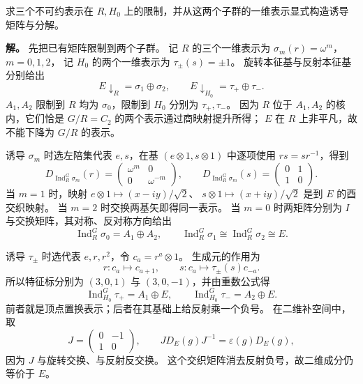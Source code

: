\begin{workedexample}[限制、商群提升与两个子群的诱导矩阵]
\label{ex:d3-comprehensive-induction}
求三个不可约表示在 $R,H_0$ 上的限制，并从这两个子群的一维表示显式构造诱导矩阵与分解。

\textbf{解。} 先把已有矩阵限制到两个子群。
记 $R$ 的三个一维表示为 $\sigma_m(r)=\omega^m$，$m=0,1,2$，
记 $H_0$ 的两个一维表示为 $\tau_\pm(s)=\pm1$。
旋转本征基与反射本征基分别给出
\[
E\downarrow_R=\sigma_1\oplus\sigma_2,\qquad
E\downarrow_{H_0}=\tau_+\oplus\tau_-.
\]
$A_1,A_2$ 限制到 $R$ 均为 $\sigma_0$，限制到 $H_0$ 分别为 $\tau_+,\tau_-$。
因为 $R$ 位于 $A_1,A_2$ 的核内，它们恰是 $G/R=C_2$ 的两个表示通过商映射提升所得；
$E$ 在 $R$ 上非平凡，故不能下降为 $G/R$ 的表示。

诱导 $\sigma_m$ 时选左陪集代表 $e,s$，在基
$(e\otimes1,s\otimes1)$ 中逐项使用 $rs=sr^{-1}$，得到
\[
D_{\operatorname{Ind}_R^G\sigma_m}(r)
=\begin{pmatrix}\omega^m&0\\0&\omega^{-m}\end{pmatrix},\qquad
D_{\operatorname{Ind}_R^G\sigma_m}(s)
=\begin{pmatrix}0&1\\1&0\end{pmatrix}.
\]
当 $m=1$ 时，映射 $e\otimes1\mapsto(x-iy)/\sqrt2$、
$s\otimes1\mapsto(x+iy)/\sqrt2$ 是到 $E$ 的酉交织映射。
当 $m=2$ 时交换两基矢即得同一表示。
当 $m=0$ 时两矩阵分别为 $I$ 与交换矩阵，其对称、反对称方向给出
\[
\operatorname{Ind}_R^G\sigma_0=A_1\oplus A_2,\qquad
\operatorname{Ind}_R^G\sigma_1\cong\operatorname{Ind}_R^G\sigma_2\cong E.
\]

诱导 $\tau_\pm$ 时选代表 $e,r,r^2$，令 $c_a=r^a\otimes1$。
生成元的作用为
\[
r:c_a\mapsto c_{a+1},\qquad
s:c_a\mapsto\tau_\pm(s)c_{-a}.
\]
所以特征标分别为 $(3,0,1)$ 与 $(3,0,-1)$，并由重数公式得
\[
\operatorname{Ind}_{H_0}^G\tau_+=A_1\oplus E,\qquad
\operatorname{Ind}_{H_0}^G\tau_-=A_2\oplus E.
\]
前者就是顶点置换表示；后者在其基础上给反射乘一个负号。
在二维补空间中，取
\[
J=\begin{pmatrix}0&-1\\1&0\end{pmatrix},\qquad
JD_E(g)J^{-1}=\varepsilon(g)D_E(g),
\]
因为 $J$ 与旋转交换、与反射反交换。
这个交织矩阵消去反射负号，故二维成分仍等价于 $E$。
\end{workedexample}

